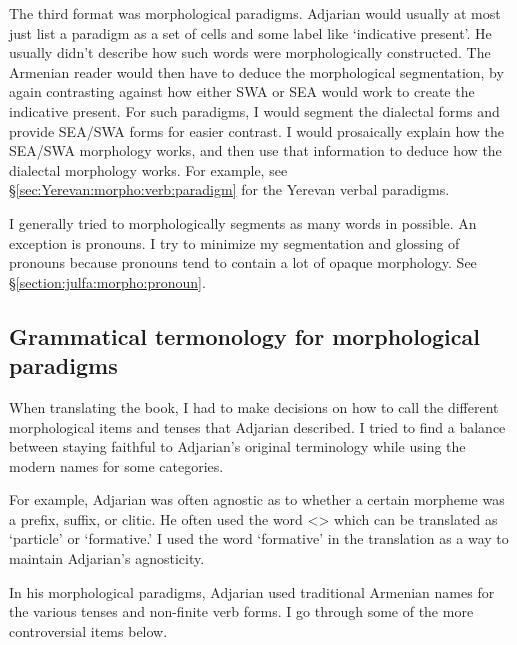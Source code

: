 The third format was morphological paradigms. Adjarian would usually at most just list a paradigm as a set of cells and some label like `indicative present'. He usually didn't describe how such words were morphologically constructed. The Armenian reader would then have to deduce the morphological segmentation, by again contrasting against how either SWA or SEA would work to  create the indicative present. For such paradigms, I would segment the dialectal forms and provide SEA/SWA forms for easier contrast. I would prosaically explain how the SEA/SWA morphology works, and then use that information to deduce how the dialectal morphology works. For example, see \S\ref{sec:Yerevan:morpho:verb:paradigm} for the Yerevan verbal paradigms. 

I generally tried to morphologically segments as many words in possible. An exception is pronouns. I try to minimize my segmentation and glossing of pronouns because pronouns tend to contain a lot of opaque morphology. See \S\ref{section:julfa:morpho:pronoun}. 

\subsection{Grammatical termonology for morphological paradigms}\label{sec:HossepIntro:translation:grammatical terms}
 
When translating the book, I had to make decisions on how to call the different morphological items and tenses that Adjarian described. I tried to find a balance between staying faithful to Adjarian's original terminology while using the modern names for some categories. 

For example, Adjarian was often agnostic as to whether a certain morpheme was a prefix, suffix, or clitic. He often used the word <> which can be translated as `particle' or `formative.' I used the word `formative' in the translation as a way to maintain Adjarian's agnosticity. 

In his morphological paradigms, Adjarian used traditional Armenian names for the various tenses and non-finite verb forms. I go through some of the more controversial items below. 

